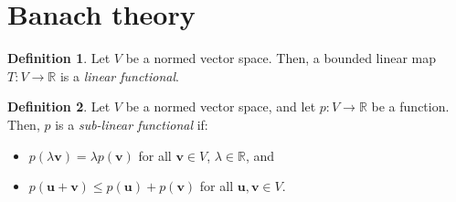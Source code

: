 \documentclass[a4paper, openany]{memoir}
\theoremstyle{definition}
\newtheorem{definition}{Definition}[section]
\theoremstyle{plain}
\begin{document}
    \section{Banach theory}
    \begin{definition}
        Let $V$ be a normed vector space. Then, a bounded linear map $T: V \to \mathbb{R}$ is a \emph{linear functional}.
    \end{definition}

    \begin{definition}
        Let $V$ be a normed vector space, and let $p: V \to \mathbb{R}$ be a function. Then, $p$ is a \emph{sub-linear functional} if:
        \begin{itemize}
            \item $p(\lambda \bm{v}) = \lambda p(\bm{v})$ for all $\bm{v} \in V$, $\lambda \in \mathbb{R}$, and
            \item $p(\bm{u} + \bm{v}) \leq p(\bm{u}) + p(\bm{v})$ for all $\bm{u}, \bm{v} \in V$.
        \end{itemize}
    \end{definition}
\end{document}
